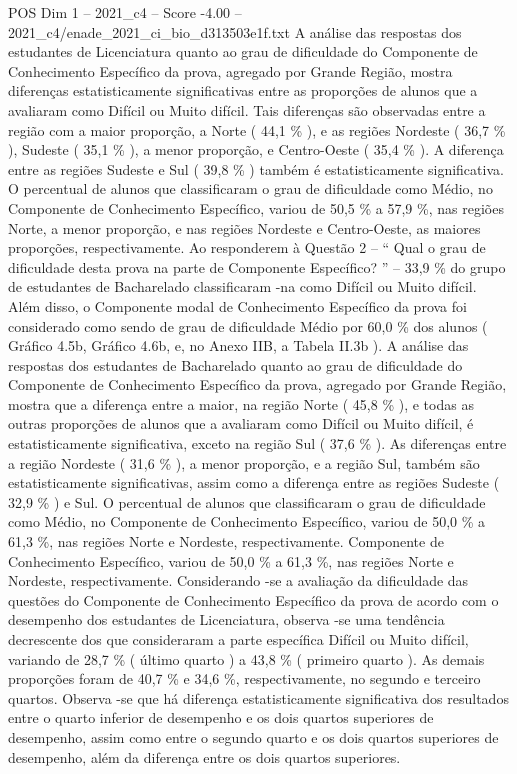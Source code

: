 \begin{textsample}{POS Dim 1 – 2021\_c4 – Score -4.00 – 2021\_c4/enade\_2021\_ci\_bio\_d313503e1f.txt}
A análise das respostas dos estudantes de Licenciatura quanto ao grau de dificuldade do Componente de Conhecimento Específico da prova, agregado por Grande Região, mostra diferenças estatisticamente significativas entre as proporções de alunos que a avaliaram como Difícil ou Muito difícil.
Tais diferenças são observadas entre a região com a maior proporção, a Norte ( 44,1 \% ), e as regiões Nordeste ( 36,7 \% ), Sudeste ( 35,1 \% ), a menor proporção, e Centro-Oeste ( 35,4 \% ).
A diferença entre as regiões Sudeste e Sul ( 39,8 \% ) também é estatisticamente significativa.
O percentual de alunos que classificaram o grau de dificuldade como Médio, no Componente de Conhecimento Específico, variou de 50,5 \% a 57,9 \%, nas regiões Norte, a menor proporção, e nas regiões Nordeste e Centro-Oeste, as maiores proporções, respectivamente.
Ao responderem à Questão 2 – “ Qual o grau de dificuldade desta prova na parte de Componente Específico? ” – 33,9 \% do grupo de estudantes de Bacharelado classificaram -na como Difícil ou Muito difícil.
Além disso, o Componente modal de Conhecimento Específico da prova foi considerado como sendo de grau de dificuldade Médio por 60,0 \% dos alunos ( Gráfico 4.5b, Gráfico 4.6b, e, no Anexo IIB, a Tabela II.3b ).
A análise das respostas dos estudantes de Bacharelado quanto ao grau de dificuldade do Componente de Conhecimento Específico da prova, agregado por Grande Região, mostra que a diferença entre a maior, na região Norte ( 45,8 \% ), e todas as outras proporções de alunos que a avaliaram como Difícil ou Muito difícil, é estatisticamente significativa, exceto na região Sul ( 37,6 \% ).
As diferenças entre a região Nordeste ( 31,6 \% ), a menor proporção, e a região Sul, também são estatisticamente significativas, assim como a diferença entre as regiões Sudeste ( 32,9 \% ) e Sul.
O percentual de alunos que classificaram o grau de dificuldade como Médio, no Componente de Conhecimento Específico, variou de 50,0 \% a 61,3 \%, nas regiões Norte e Nordeste, respectivamente.
Componente de Conhecimento Específico, variou de 50,0 \% a 61,3 \%, nas regiões Norte e Nordeste, respectivamente.
Considerando -se a avaliação da dificuldade das questões do Componente de Conhecimento Específico da prova de acordo com o desempenho dos estudantes de Licenciatura, observa -se uma tendência decrescente dos que consideraram a parte específica Difícil ou Muito difícil, variando de 28,7 \% ( último quarto ) a 43,8 \% ( primeiro quarto ).
As demais proporções foram de 40,7 \% e 34,6 \%, respectivamente, no segundo e terceiro quartos.
Observa -se que há diferença estatisticamente significativa dos resultados entre o quarto inferior de desempenho e os dois quartos superiores de desempenho, assim como entre o segundo quarto e os dois quartos superiores de desempenho, além da diferença entre os dois quartos superiores.

\end{textsample}
